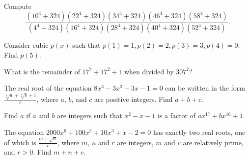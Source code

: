 \documentclass[mast]{lucky}
\begin{document}
\begin{prob}[AIME 1987/14]{4}
Compute
\[\frac{(10^4+324)(22^4+324)(34^4+324)(46^4+324)(58^4+324)}{(4^4+324)(16^4+324)(28^4+324)(40^4+324)(52^4+324)}.\]
\end{prob}

\begin{prob}[]{4}
Consider cubic $p(x)$ such that $p(1)=1,p(2)=2,p(3)=3,p(4)=0.$ Find $p(5).$
\end{prob}
    
\begin{req}[JMC 10 2020/22]{6}
What is the remainder of $17^7+17^2+1$ when divided by $307^2?$
\end{req}
    
\begin{prob}[AIME I 2013/5]{9}
The real root of the equation $8x^3 - 3x^2 - 3x - 1 = 0$ can be written in the form $\frac{\sqrt[3]a + \sqrt[3]b + 1}{c}$, where $a$, $b$, and $c$ are positive integers. Find $a+b+c$.
\end{prob}
    
\begin{prob}[AIME 1988/13]{13}
Find $a$ if $a$ and $b$ are integers such that $x^2 - x - 1$ is a factor of $ax^{17} + bx^{16} + 1$.
\end{prob}
    
\begin{prob}[AIME II 2000/13]{13}
The equation $2000x^6+100x^5+10x^3+x-2=0$ has exactly two real roots, one of which is $\frac{m+\sqrt{n}}r$, where $m$, $n$ and $r$ are integers, $m$ and $r$ are relatively prime, and $r>0$. Find $m+n+r$.
\end{prob}
\end{document}
